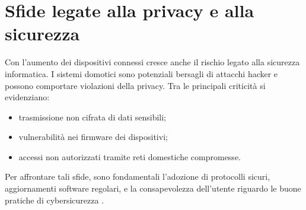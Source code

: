 \section{Sfide legate alla privacy e alla sicurezza}
Con l’aumento dei dispositivi connessi cresce anche il rischio legato alla sicurezza informatica. I sistemi domotici sono potenziali bersagli di attacchi hacker e possono comportare violazioni della privacy. Tra le principali criticità si evidenziano:
\begin{itemize}
    \item trasmissione non cifrata di dati sensibili;
    \item vulnerabilità nei firmware dei dispositivi;
    \item accessi non autorizzati tramite reti domestiche compromesse.
\end{itemize}

Per affrontare tali sfide, sono fondamentali l’adozione di protocolli sicuri, aggiornamenti software regolari, e la consapevolezza dell’utente riguardo le buone pratiche di cybersicurezza \parencite{nistIotSecurity}.



